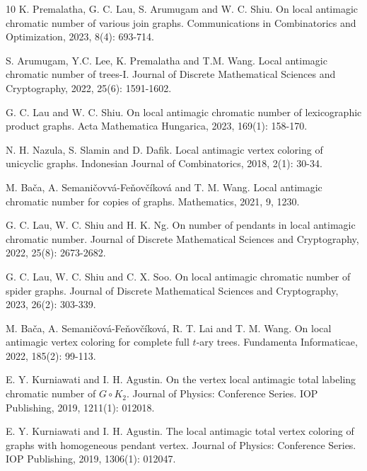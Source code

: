 \documentclass[12pt]{article}
\begin{document}
\begin{thebibliography}{10}
 K. Premalatha, G. C. Lau, S. Arumugam and W. C. Shiu. On local antimagic chromatic number of various join graphs. Communications in Combinatorics and Optimization, 2023, 8(4): 693-714.


 S. Arumugam, Y.C. Lee, K. Premalatha and T.M. Wang. Local antimagic chromatic number of trees-I. Journal of Discrete Mathematical Sciences and Cryptography, 2022, 25(6): 1591-1602. %

 G. C. Lau and W. C. Shiu. On local antimagic chromatic number of lexicographic product graphs. Acta Mathematica Hungarica, 2023, 169(1): 158-170.

 N. H. Nazula, S. Slamin and D. Dafik. Local antimagic vertex coloring of unicyclic graphs. Indonesian Journal of Combinatorics, 2018, 2(1): 30-34.

 M. Ba\v{c}a, A. Semani\v{c}ovv\'{a}-Fe\v{n}ov\v{c}\'{i}kov\'{a} and T. M. Wang. Local antimagic chromatic number for copies of graphs. Mathematics, 2021, 9, 1230. %

 G. C. Lau, W. C. Shiu and H. K. Ng. On number of pendants in local antimagic chromatic number. Journal of Discrete Mathematical Sciences and Cryptography, 2022, 25(8): 2673-2682.

 G. C. Lau, W. C. Shiu and C. X. Soo. On local antimagic chromatic number of spider graphs. Journal of Discrete Mathematical Sciences and Cryptography, 2023, 26(2): 303-339.

 M. Ba\v{c}a, A. Semani\v{c}ov\'{a}-Fe\v{n}ov\v{c}\'{i}kov\'{a}, R. T. Lai and T. M. Wang. On local antimagic vertex coloring for complete full $t$-ary trees. Fundamenta Informaticae, 2022, 185(2): 99-113.

 E. Y. Kurniawati and I. H. Agustin. On the vertex local antimagic total labeling chromatic number of $G\circ K_{2}$. Journal of Physics: Conference Series. IOP Publishing, 2019, 1211(1): 012018.

 E. Y. Kurniawati and I. H. Agustin. The local antimagic total vertex coloring of graphs with homogeneous pendant vertex. Journal of Physics: Conference Series. IOP Publishing, 2019, 1306(1): 012047.


\end{thebibliography}
\end{document}
